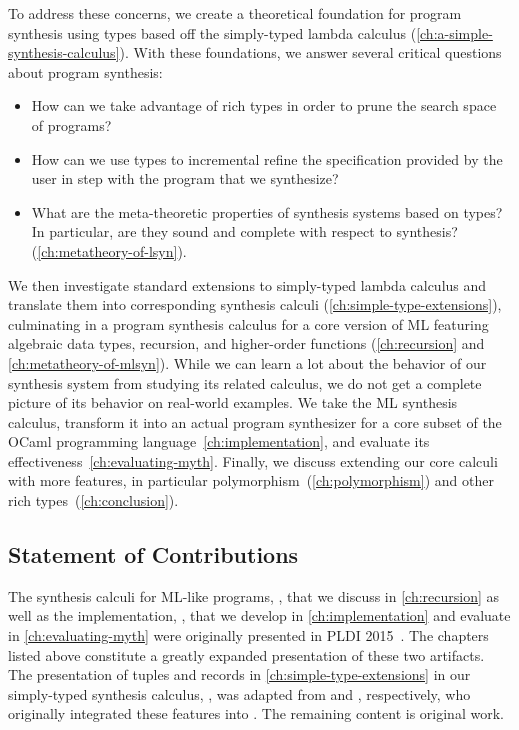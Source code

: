To address these concerns, we create a theoretical foundation for program synthesis using types based off the simply-typed lambda calculus (\autoref{ch:a-simple-synthesis-calculus}).
With these foundations, we answer several critical questions about program synthesis:
\begin{itemize}
  \item How can we take advantage of rich types in order to prune the search space of programs?
  \item How can we use types to incremental refine the specification provided by the user in step with the program that we synthesize?
  \item What are the meta-theoretic properties of synthesis systems based on types?  In particular, are they sound and complete with respect to synthesis? (\autoref{ch:metatheory-of-lsyn}).
\end{itemize}
We then investigate standard extensions to simply-typed lambda calculus and translate them into corresponding synthesis calculi (\autoref{ch:simple-type-extensions}), culminating in a program synthesis calculus for a core version of ML featuring algebraic data types, recursion, and higher-order functions (\autoref{ch:recursion} and \autoref{ch:metatheory-of-mlsyn}).
While we can learn a lot about the behavior of our synthesis system from studying its related calculus, we do not get a complete picture of its behavior on real-world examples.
We take the ML synthesis calculus, transform it into an actual program synthesizer for a core subset of the OCaml programming language~\autoref{ch:implementation}, and evaluate its effectiveness~\autoref{ch:evaluating-myth}.
Finally, we discuss extending our core calculi with more features, in particular polymorphism~(\autoref{ch:polymorphism}) and other rich types~(\autoref{ch:conclusion}).

\subsection{Statement of Contributions}

The synthesis calculi for ML-like programs, \mlsyn{}, that we discuss in \autoref{ch:recursion} as well as the implementation, \myth{}, that we develop in \autoref{ch:implementation} and evaluate in \autoref{ch:evaluating-myth} were originally presented in {PLDI} 2015~\citep{osera-pldi-2015}.
The chapters listed above constitute a greatly expanded presentation of these two artifacts.
The presentation of tuples and records in \autoref{ch:simple-type-extensions} in our simply-typed synthesis calculus, \lsyn{}, was adapted from \citet{frankle-mastersthesis-2015} and \citet{shah-mastersthesis-2015}, respectively, who originally integrated these features into \mlsyn{}.
The remaining content is original work.
